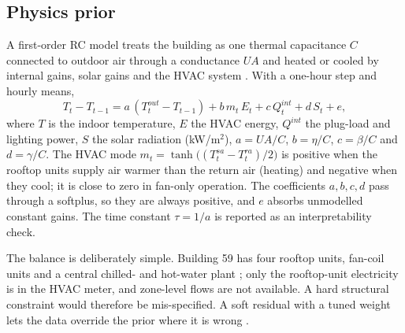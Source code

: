 \subsection{Physics prior}
A first-order RC model treats the building as one thermal capacitance $C$ connected to outdoor air through a conductance $UA$ and heated or cooled by internal gains, solar gains and the HVAC system \citep{bacher2011greybox}. With a one-hour step and hourly means,
\begin{equation}
T_t - T_{t-1} = a\,(T^{out}_t - T_{t-1}) + b\, m_t\, E_t + c\, Q^{int}_t + d\, S_t + e, \label{eq:rc}
\end{equation}
where $T$ is the indoor temperature, $E$ the HVAC energy, $Q^{int}$ the plug-load and lighting power, $S$ the solar radiation (kW/m$^2$), $a = UA/C$, $b=\eta/C$, $c=\beta/C$ and $d=\gamma/C$. The HVAC mode $m_t = \tanh\!\big((T^{sa}_t - T^{ra}_t)/2\big)$ is positive when the rooftop units supply air warmer than the return air (heating) and negative when they cool; it is close to zero in fan-only operation. The coefficients $a,b,c,d$ pass through a softplus, so they are always positive, and $e$ absorbs unmodelled constant gains. The time constant $\tau = 1/a$ is reported as an interpretability check.

The balance is deliberately simple. Building 59 has four rooftop units, fan-coil units and a central chilled- and hot-water plant \citep{mahajan2024bnn}; only the rooftop-unit electricity is in the HVAC meter, and zone-level flows are not available. A hard structural constraint would therefore be mis-specified. A soft residual with a tuned weight lets the data override the prior where it is wrong \citep{karniadakis2021piml,ma2025review}.

